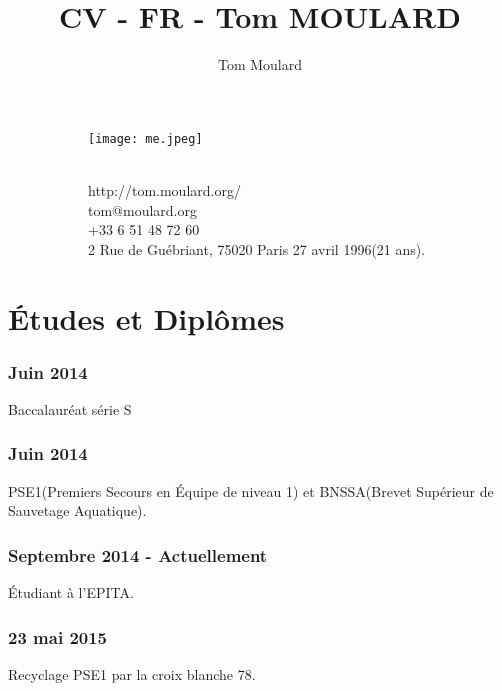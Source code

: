 \documentclass{article}
\begin{document}
    \title{CV - FR - Tom MOULARD}

    \author{Tom Moulard}

    \begin{center}
        \begin{figure}
            \centering
            \begin{subfigure}[b]{0.3\textwidth}
                \texttt{[image: me.jpeg]}
            \end{subfigure}
            \begin{subfigure}[b]{0.3\textwidth}
                {\huge\bfseries\theauthor}\\
                \vspace{.25em}
                http://tom.moulard.org/\\
                tom@moulard.org\\
                +33 6 51 48 72 60\\
                2 Rue de Gu\'ebriant,
                75020 Paris
                27 avril 1996(21 ans).
            \end{subfigure}
        \end{figure}
    \end{center}

    \hspace{-.25em}
    \section{\'Etudes et Dipl\^omes}
        \subsubsection{Juin 2014}
            Baccalaur\'eat s\'erie S
        \subsubsection{Juin 2014}
            PSE1(Premiers Secours en \'Equipe de niveau 1) et BNSSA(Brevet Sup\'erieur de Sauvetage Aquatique).
        \subsubsection{Septembre 2014 - Actuellement}
            \'Etudiant \`a l'EPITA.
        \subsubsection{23 mai 2015}
            Recyclage PSE1 par la croix blanche 78.
\end{document}

